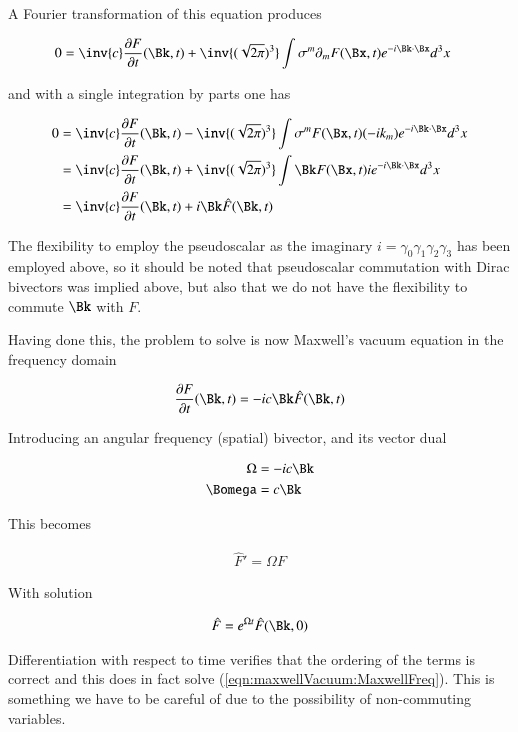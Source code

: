 A Fourier transformation of this equation produces

\begin{align*}
0 &= \inv{c} \frac{\partial F}{\partial t}(\Bk,t) + \inv{(\sqrt{2\pi})^3} \int \sigma^m \partial_m F(\Bx,t) e^{-i \Bk \cdot \Bx} d^3 x
\end{align*}

and with a single integration by parts one has

\begin{align*}
0
&= \inv{c} \frac{\partial F}{\partial t}(\Bk,t) - \inv{(\sqrt{2\pi})^3} \int \sigma^m F(\Bx,t) (-i k_m) e^{-i \Bk \cdot \Bx} d^3 x \\
&= \inv{c} \frac{\partial F}{\partial t}(\Bk,t) + \inv{(\sqrt{2\pi})^3} \int \Bk F(\Bx,t) i e^{-i \Bk \cdot \Bx} d^3 x \\
&= \inv{c} \frac{\partial F}{\partial t}(\Bk,t) + i \Bk \hat{F}(\Bk,t)
\end{align*}

The flexibility to employ the pseudoscalar as the imaginary $i = \gamma_0 \gamma_1 \gamma_2 \gamma_3$ has been employed above, so it should be noted that pseudoscalar commutation with Dirac bivectors was implied above, but also that we do not have the flexibility to commute $\Bk$ with $F$.

Having done this, the problem to solve is now Maxwell's vacuum equation in the frequency domain

\begin{align*}
\frac{\partial F}{\partial t}(\Bk,t) = -i c \Bk \hat{F}(\Bk,t)
\end{align*}

Introducing an angular frequency (spatial) bivector, and its vector dual

\begin{align}
\Omega &= -i c \Bk \\
\Bomega &= c \Bk
\end{align}

This becomes

\begin{align}\label{eqn:maxwellVacuum:MaxwellFreq}
\hat{F}' = \Omega F
\end{align}

With solution

\begin{align}
\hat{F} = e^{\Omega t} \hat{F}(\Bk,0)
\end{align}

Differentiation with respect to time verifies that the ordering of the terms is correct and this does in fact solve (\ref{eqn:maxwellVacuum:MaxwellFreq}).  This is something we have to be careful of due to the possibility of non-commuting variables.

